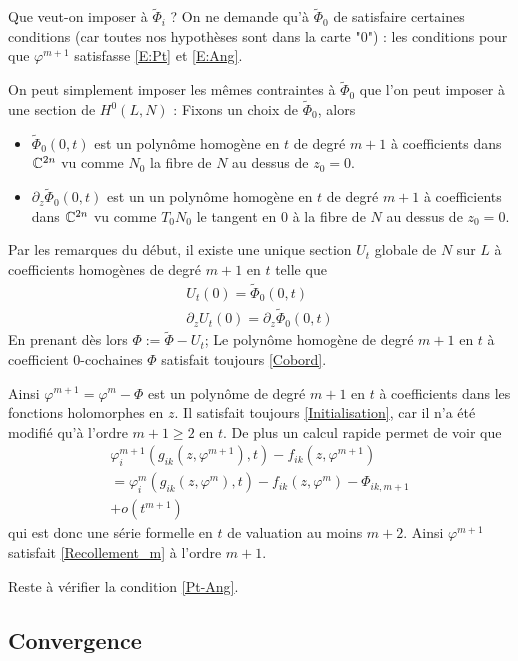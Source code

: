 \documentclass[a4paper,10pt,draft,makeidx,twocolumn]{amsart}
\begin{document}
Que veut-on imposer à $\tilde\Phi_i$ ?
On ne demande qu'à $\tilde\Phi_0$ de satisfaire certaines conditions (car toutes nos hypothèses sont dans la carte "$0$") : les conditions pour que $\varphi^{m+1}$ satisfasse \eqref{E:Pt} et \eqref{E:Ang}.

On peut simplement imposer les mêmes contraintes à $\tilde\Phi_0$ que l'on peut imposer à une section de $H^0(L,N)$ : Fixons un choix de $\tilde\Phi_0$, alors
\begin{itemize}
 \item $\tilde\Phi_0(0,t)$ est un polynôme homogène en $t$ de degré $m+1$ à coefficients dans $\mathbb{C}^{2n}$ vu comme $N_0$ la fibre de $N$ au dessus de $z_0=0$.
\item $\partial_z \tilde\Phi_0(0,t)$ est un un polynôme homogène en $t$ de degré $m+1$ à coefficients dans $\mathbb{C}^{2n}$ vu comme $T_0N_0$ le tangent en $0$ à la fibre de $N$ au dessus de $z_0=0$.
 \end{itemize}
Par les remarques du début, il existe une unique section $U_t$ globale de $N$ sur $L$ à coefficients homogènes de degré $m+1$ en $t$ telle que
\begin{subequations}
\begin{gather}
	U_t(0) = \tilde\Phi_0(0,t)\\
	\partial_z U_t (0) = \partial_z \tilde\Phi_0(0,t)
\end{gather}
\end{subequations}
En prenant dès lors $\Phi := \tilde\Phi - U_t$; Le polynôme homogène de degré $m+1$ en $t$ à coefficient $0$-cochaines $\Phi$ satisfait toujours \eqref{Cobord}.

Ainsi $\varphi^{m+1} = \varphi^m - \Phi$ est un polynôme de degré $m+1$ en $t$ à coefficients dans les fonctions holomorphes en $z$. Il satisfait toujours \eqref{Initialisation}, car il n'a été modifié qu'à l'ordre $m+1 \geq 2$ en $t$.
De plus un calcul rapide permet de voir que
\begin{multline}
\varphi^{m+1}_i(g_{ik}(z,\varphi^{m+1}),t) - f_{ik}(z, \varphi^{m+1}) \\= 
\varphi^{m}_i(g_{ik}(z,\varphi^{m}),t) - f_{ik}(z, \varphi^{m}) - \Phi_{ik,m+1}\\
+o(t^{m+1})
\end{multline}
qui est donc une série formelle en $t$ de valuation au moins $m+2$. Ainsi $\varphi^{m+1}$ satisfait \eqref{Recollement_m} à l'ordre $m+1$.

Reste à vérifier la condition \eqref{Pt-Ang}.

\subsection{Convergence}
\end{document}

